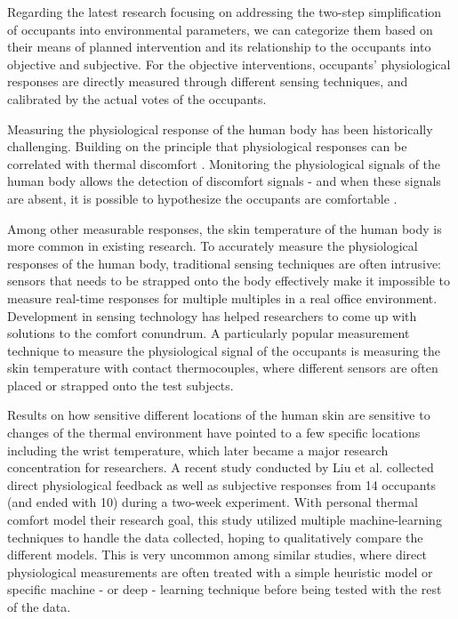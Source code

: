 Regarding the latest research focusing on addressing the two-step simplification of occupants into environmental parameters, we can categorize them based on their means of planned intervention and its relationship to the occupants into objective and subjective. For the objective interventions, occupants' physiological responses are directly measured through different sensing techniques, and calibrated by the actual votes of the occupants. 

Measuring the physiological response of the human body has been historically challenging. Building on the principle that physiological responses can be correlated with thermal discomfort \cite{huizenga_skin_2004}. Monitoring the physiological signals of the human body allows the detection of discomfort signals - and when these signals are absent, it is possible to hypothesize the occupants are comfortable \cite{takada_prediction_2013,bicego_physiology_2007}.


Among other measurable responses, the skin temperature of the human body is more common in existing research. To accurately measure the physiological responses of the human body, traditional sensing techniques are often intrusive: sensors that needs to be strapped onto the body \cite{mccarthy_validation_2016} effectively make it impossible to measure real-time responses for multiple multiples in a real office environment. Development in sensing technology has helped researchers to come up with solutions to the comfort conundrum. A particularly popular measurement technique to measure the physiological signal of the occupants is measuring the skin temperature with contact thermocouples, where different sensors are often placed or strapped onto the test subjects\cite{choi_cobi:_2010}. 

Results on how sensitive different locations of the human skin are sensitive to changes of the thermal environment have pointed to a few specific locations including the wrist temperature, which later became a major research concentration for researchers\cite{choi_cobi:_2010}. 
A recent study conducted by Liu et al. collected direct physiological feedback as well as subjective responses from 14 occupants (and ended with 10) during a two-week experiment\cite{liu_personal_2019}. With personal thermal comfort model their research goal, this study utilized multiple machine-learning techniques to handle the data collected, hoping to qualitatively compare the different models. This is very uncommon among similar studies, where direct physiological measurements are often treated with a simple heuristic model \cite{garg_smart_2000} or specific machine \cite{anguita_public_2013} - or deep - learning technique before being tested with the rest of the data\cite{kim_personal_2018}. 

